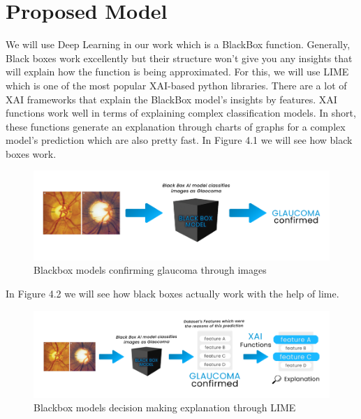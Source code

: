 \section{Proposed Model} 
We will use Deep Learning in our work which is a BlackBox function. Generally, Black boxes work excellently but their structure won’t give you any insights that will explain how the function is being approximated. For this, we will use LIME which is one of the most popular XAI-based python libraries. There are a lot of XAI frameworks that explain the BlackBox model’s insights by features. XAI functions work well in terms of explaining complex classification models. In short, these functions generate an explanation through charts of graphs for a complex model's prediction which are also pretty fast. In Figure 4.1 we will see how black boxes work.

\vspace{5mm}
\begin{figure}[htbp]
\centering
\includegraphics[scale=0.70]{images/fig-1.png}
\caption{Blackbox models confirming glaucoma through images}
\label{fig:x Blackbox models confirming glaucoma through images}
\end{figure}

\vspace{5mm}
In Figure 4.2 we will see how black boxes actually work with the help of lime.

\vspace{5mm}
\begin{figure}[htbp]
\centering
\includegraphics[scale=0.70]{images/fig-2.png}
\caption{Blackbox models decision making explanation through LIME}
\label{fig:x Blackbox models decision making explanation through LIME}
\end{figure}

